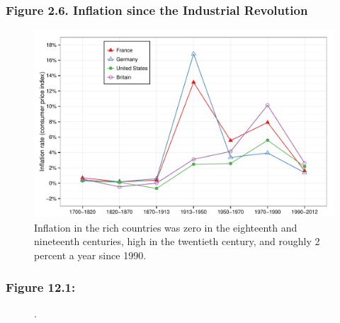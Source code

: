 \documentclass[t]{beamer}\usepackage[]{graphicx}\usepackage[]{color}
\newenvironment{knitrout}{}{} %
\begin{document}
\begin{frame}[label=Figure_2_6,fragile]
\frametitle{Figure 2.6. Inflation since the Industrial Revolution}
\begin{figure}[t]
\begin{minipage}[b]{\textwidth}
\centering
\begin{knitrout}\footnotesize
{}\color{fgcolor}

{\centering \includegraphics[width=1\linewidth]{figures/color/Figure_2_6} 

}



\end{knitrout}
\caption{Inflation in the rich countries was zero in the eighteenth and nineteenth centuries, high in the twentieth century, and roughly 2 percent a year since 1990.}
\end{minipage}
\end{figure}
\end{frame}


\begin{frame}[label=Figure_12_1]
\frametitle{Figure 12.1: }
\begin{figure}[t]
\begin{minipage}[b]{\textwidth}
\centering

\caption{.}
\end{minipage}
\end{figure}
\end{frame}
\end{document}
